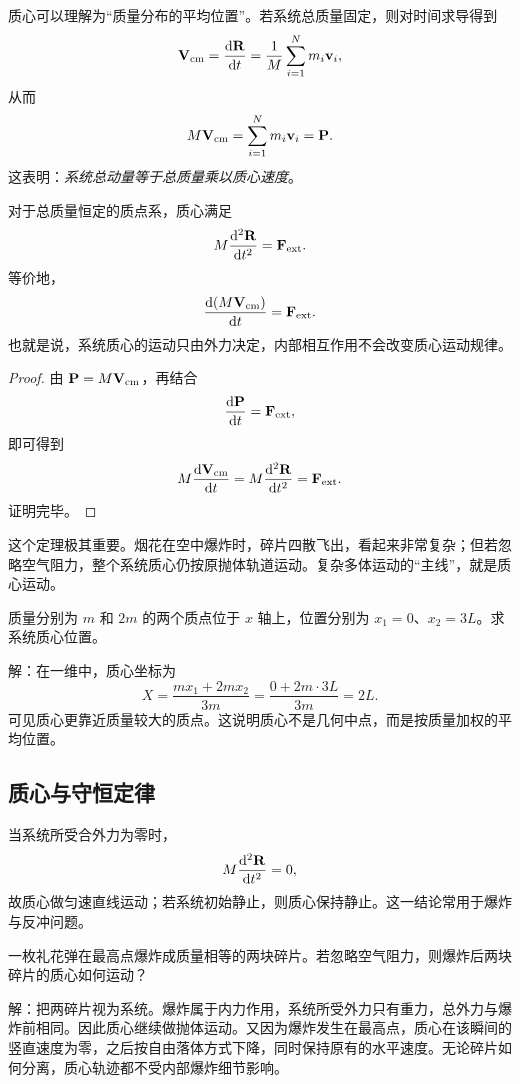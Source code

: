 质心可以理解为“质量分布的平均位置”。若系统总质量固定，则对时间求导得到
\[
\vb V_{\text{cm}}=\dv{\vb R}{t}=\frac{1}{M}\sum_{i=1}^N m_i\vb v_i,
\]
从而
\[
M\vb V_{\text{cm}}=\sum_{i=1}^N m_i\vb v_i=\vb P.
\]
这表明：\emph{系统总动量等于总质量乘以质心速度}。

\begin{theorem}[质心运动定理]
对于总质量恒定的质点系，质心满足
\[
M\dv[2]{\vb R}{t}=\vb F_{\text{ext}}.
\]
等价地，
\[
\dv{(M\vb{V}_{\text{cm}})}{t}=\vb F_{\text{ext}}.
\]
也就是说，系统质心的运动只由外力决定，内部相互作用不会改变质心运动规律。
\end{theorem}

\begin{proof}
由 $\vb P=M\vb V_{\text{cm}}$，再结合
\[
\dv{\vb P}{t}=\vb F_{\text{ext}},
\]
即可得到
\[
M\dv{\vb V_{\text{cm}}}{t}=M\dv[2]{\vb R}{t}=\vb F_{\text{ext}}.
\]
证明完毕。
\end{proof}

\begin{remark}
这个定理极其重要。烟花在空中爆炸时，碎片四散飞出，看起来非常复杂；但若忽略空气阻力，整个系统质心仍按原抛体轨道运动。复杂多体运动的“主线”，就是质心运动。
\end{remark}

\begin{example}
质量分别为 $m$ 和 $2m$ 的两个质点位于 $x$ 轴上，位置分别为 $x_1=0$、$x_2=3L$。求系统质心位置。

解：在一维中，质心坐标为
\[
X=\frac{mx_1+2mx_2}{3m}=\frac{0+2m\cdot 3L}{3m}=2L.
\]
可见质心更靠近质量较大的质点。这说明质心不是几何中点，而是按质量加权的平均位置。
\end{example}

\subsection{质心与守恒定律}

当系统所受合外力为零时，
\[
M\dv[2]{\vb R}{t}=0,
\]
故质心做匀速直线运动；若系统初始静止，则质心保持静止。这一结论常用于爆炸与反冲问题。

\begin{example}
一枚礼花弹在最高点爆炸成质量相等的两块碎片。若忽略空气阻力，则爆炸后两块碎片的质心如何运动？

解：把两碎片视为系统。爆炸属于内力作用，系统所受外力只有重力，总外力与爆炸前相同。因此质心继续做抛体运动。又因为爆炸发生在最高点，质心在该瞬间的竖直速度为零，之后按自由落体方式下降，同时保持原有的水平速度。无论碎片如何分离，质心轨迹都不受内部爆炸细节影响。
\end{example}


